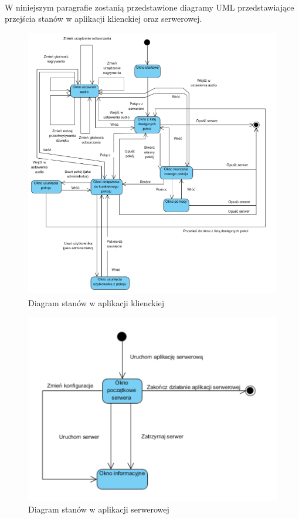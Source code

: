 \documentclass{article}
\begin{document}
	\paragraph{} W niniejszym paragrafie zostanią przedstawione diagramy UML przedstawiające przejścia stanów w aplikacji klienckiej oraz serwerowej.
	\begin{figure}[H]
		\centering
		\hspace*{-0cm} 
		\includegraphics[scale=0.9]{stan1}
		\caption[]{Diagram stanów w aplikacji klienckiej}
		\label{fig:kli}
	\end{figure}
	\begin{figure}[H]
		\centering
		\hspace*{-0cm} 
		\includegraphics[scale=0.9]{stan2}
		\caption[]{Diagram stanów w aplikacji serwerowej}
		\label{fig:ser}
	\end{figure}
\end{document}
